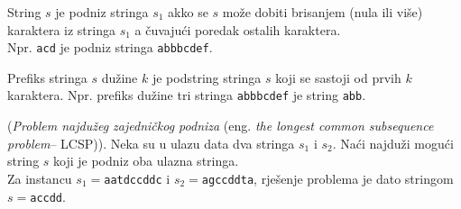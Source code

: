  \begin{definition}
 	String $s$ je podniz stringa $s_1$ akko se $s$ može dobiti brisanjem (nula ili više)
 	karaktera iz stringa $s_1$ a čuvajući poredak ostalih karaktera. \\
 	Npr.  \texttt{acd} je podniz stringa \texttt{abbbcdef}.   
 	
 	Prefiks stringa $s$ dužine $k$ je podstring stringa $s$ koji se sastoji od prvih $k$ karaktera. Npr. prefiks dužine tri stringa \texttt{abbbcdef} je string \texttt{abb}. 
 	
 \end{definition}
 
 \begin{example}
 	(\textit{Problem najdužeg zajedničkog podniza} (eng. \textit{the longest common subsequence problem}-- LCSP)).  Neka su u ulazu data dva stringa $s_1$ i $s_2$. Naći najduži mogući string $s$ koji je podniz oba ulazna stringa.  \\
 	
 	Za instancu $s_1=$\texttt{aatdccddc} i $s_2=$\texttt{agccddta}, rješenje problema je dato stringom $s=$\texttt{accdd}. 
 	
 \end{example}

